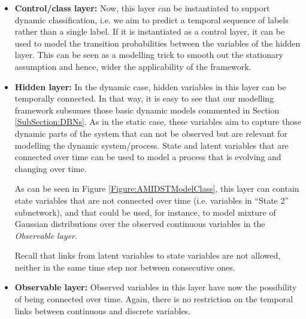 \begin{itemize}

\item \textbf{Control/class layer:} Now, this layer can be instantiated to support dynamic classification, i.e. we aim to predict a temporal sequence of labels rather than a single label. If it is instantiated as a control layer, it can be used to model the transition probabilities between the variables of the hidden layer. This can be seen as a modelling trick to smooth out the stationary assumption and hence, wider the applicability of the framework.

\item \textbf{Hidden layer:}  In the dynamic case, hidden variables in this layer can be temporally connected. In that way, it is easy to see that our modelling framework subsumes those basic dynamic models commented in Section \ref{SubSection:DBNs}. As in the static case, these variables aim to capture those dynamic parts of the system that can not be observed but are relevant for modelling the dynamic system/process. State and latent variables that are connected over time can be used to model a process that is evolving and changing over time.

As can be seen in Figure \ref{Figure:AMIDSTModelClass}, this layer can contain state variables that are not connected over time (i.e. variables in ``State 2'' subnetwork), and that could be used, for instance, to model mixture of Gaussian distributions over the observed continuous variables in the \textit{Observable layer}. 

Recall that links from latent variables to state variables are not allowed, neither in the same time step nor between consecutive ones.

\item \textbf{Observable layer:}  Observed variables in this layer have now the possibility of being connected over time. Again, there is no restriction on the temporal links between continuous and discrete variables. 

\end{itemize} 



